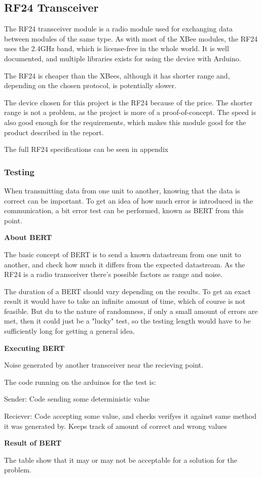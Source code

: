 \subsection{RF24 Transceiver}
The RF24 transceiver module is a radio module used for exchanging data between modules of the same type. As with most of the XBee modules, the RF24 uses the 2.4GHz band, which is license-free in the whole world. It is well documented, and multiple libraries exists for using the device with Arduino.

The RF24 is cheaper than the XBees, although it has shorter range and, depending on the chosen protocol, is potentially slower.

The device chosen for this project is the RF24 because of the price. The shorter range is not a problem, as the project is more of a proof-of-concept. The speed is also good enough for the requirements, which makes this module good for the product described in the report.


The full RF24 specifications can be seen in appendix 

\subsubsection{Testing}
When transmitting data from one unit to another, knowing that the data is correct can be important. To get an idea of how much error is introduced in the communication, a bit error test can be performed, known as BERT from this point.

\textbf{About BERT}

The basic concept of BERT is to send a known datastream from one unit to another, and check how much it differs from the expected datastream. As the RF24 is a radio transceiver there's possible factors as range and noise. 

The duration of a BERT should vary depending on the results. To get an exact result it would have to take an infinite amount of time, which of course is not feasible. But du to the nature of randomness, if only a small amount of errors are met, then it could just be a "lucky"  test, so the testing length would have to be sufficiently long for getting a general idea.

\textbf{Executing BERT} 

Noise generated by another transceiver near the recieving point.

The code running on the arduinos for the test is:

Sender:
Code sending some deterministic value

Reciever:
Code accepting some value, and checks verifyes it against same method it was generated by.
Keeps track of amount of correct and wrong values

\textbf{Result of BERT}


The table show that it may or may not be acceptable for a solution for the problem.

